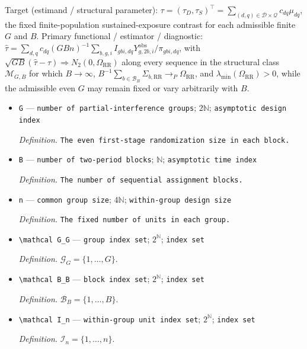 \documentclass{article}
\begin{document}
Target (estimand / structural parameter): \(\tau=(\tau_D,\tau_S)^\top=\sum_{(d,q)\in\mathcal D\times\mathcal Q}c_{dq}\mu_{dq}\), the fixed finite-population sustained-exposure contrast for each admissible finite \(G\) and \(B\).
Primary functional / estimator / diagnostic: \(\widehat\tau=\sum_{d,q}c_{dq}(GBn)^{-1}\sum_{b,g,i}I_{gbi,dq}Y^{\mathrm{obs}}_{g,2b,i}/\pi_{gbi,dq}\), with \(\sqrt{GB}(\widehat\tau-\tau)\Rightarrow N_2(0,\Omega_{\mathrm{RR}})\) along every sequence in the structural class \(\mathcal M_{G,B}\) for which \(B\to\infty\), \(B^{-1}\sum_{b\in\mathcal B_B}\Sigma_{b,\mathrm{RR}}\to_P\Omega_{\mathrm{RR}}\), and \(\lambda_{\min}(\Omega_{\mathrm{RR}})>0\), while the admissible even \(G\) may remain fixed or vary arbitrarily with \(B\).
\begin{itemize}
  \item \texttt{G} --- \texttt{number of partial-\allowbreak{}interference groups}; \(2\mathbb N\); \texttt{asymptotic design index}
  \par\smallskip\noindent\emph{Definition.} \texttt{The even first-\allowbreak{}stage randomization size in each block.}
  \item \texttt{B} --- \texttt{number of two-\allowbreak{}period blocks}; \(\mathbb N\); \texttt{asymptotic time index}
  \par\smallskip\noindent\emph{Definition.} \texttt{The number of sequential assignment blocks.}
  \item \texttt{n} --- \texttt{common group size}; \(4\mathbb N\); \texttt{within-\allowbreak{}group design size}
  \par\smallskip\noindent\emph{Definition.} \texttt{The fixed number of units in each group.}
  \item \texttt{\textbackslash{}\allowbreak{}mathcal G\_\allowbreak{}G} --- \texttt{group index set}; \(2^{\mathbb N}\); \texttt{index set}
  \par\smallskip\noindent\emph{Definition.} \(\mathcal G_G=\{1,\ldots,G\}\).
  \item \texttt{\textbackslash{}\allowbreak{}mathcal B\_\allowbreak{}B} --- \texttt{block index set}; \(2^{\mathbb N}\); \texttt{index set}
  \par\smallskip\noindent\emph{Definition.} \(\mathcal B_B=\{1,\ldots,B\}\).
  \item \texttt{\textbackslash{}\allowbreak{}mathcal I\_\allowbreak{}n} --- \texttt{within-\allowbreak{}group unit index set}; \(2^{\mathbb N}\); \texttt{index set}
  \par\smallskip\noindent\emph{Definition.} \(\mathcal I_n=\{1,\ldots,n\}\).

\end{itemize}
\end{document}
